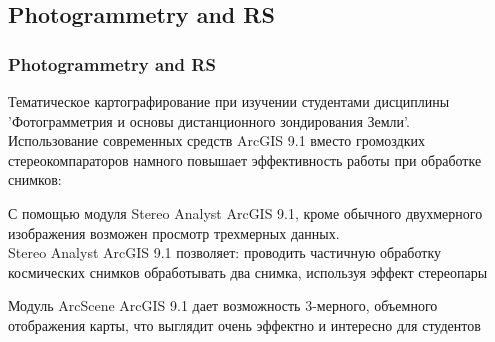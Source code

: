 \documentclass[pdflatex,compress,8pt,
	xcolor={dvipsnames,dvipsnames,svgnames,x11names,table},
	hyperref={	 
	pdfauthor={Lemenkova Polina}, 
	pdfsubject={Preentation}, 
	pdfcreator={Lemenkova Polina}, 
	pdfproducer={Lemenkova Polina}, 
	colorlinks=true,
	linkcolor=Red3, 
	citecolor=NavyBlue, 
	urlcolor = NavyBlue, 
	breaklinks = true}]{beamer}
\begin{document}
\subsection{Photogrammetry and RS}
\begin{frame}\frametitle{Photogrammetry and RS}

\begin{alertblock}{}
Тематическое картографирование при изучении студентами дисциплины 'Фотограмметрия и основы дистанционного зондирования Земли'. \\
Использование современных средств ArcGIS 9.1 вместо громоздких стереокомпараторов намного повышает эффективность работы при обработке снимков:
\end{alertblock}

\begin{block}{}
С помощью модуля Stereo Analyst ArcGIS 9.1, кроме обычного двухмерного изображения возможен просмотр трехмерных данных.\\
Stereo Analyst ArcGIS 9.1 позволяет: проводить частичную обработку космических снимков обработывать два снимка, используя эффект стереопары
\end{block}

\begin{figure}[H]
	\centering
			\hspace{1mm}
			\hspace{1mm}
\end{figure}

\begin{alertblock}{}
Модуль ArcScene ArcGIS 9.1 дает возможность 3-мерного, объемного отображения карты, что выглядит очень эффектно и интересно для студентов
\end{alertblock}

\end{frame}
\end{document}
